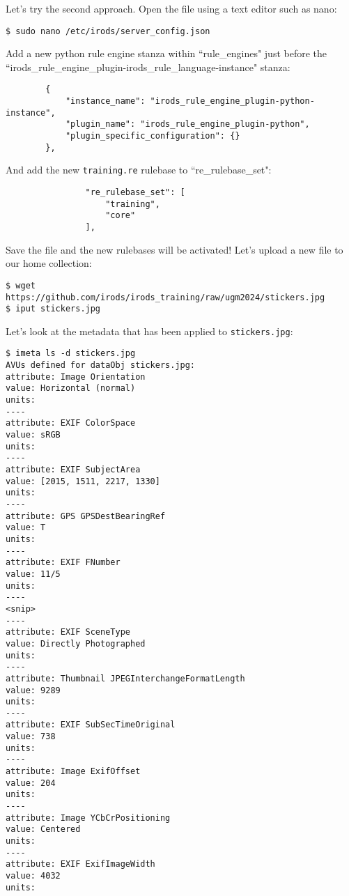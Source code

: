 \documentclass[10pt,oneside]{memoir}
\begin{document}
Let's try the second approach. Open the file using a text editor such as nano:

\begin{lstlisting}
$ sudo nano /etc/irods/server_config.json
\end{lstlisting}

Add a new python rule engine stanza within ``rule\_engines" just before the ``irods\_rule\_engine\_plugin-irods\_rule\_language-instance" stanza:

\begin{lrbox}{\lstServerConfigA}
\begin{lstlisting}
        {
            "instance_name": "irods_rule_engine_plugin-python-instance",
            "plugin_name": "irods_rule_engine_plugin-python",
            "plugin_specific_configuration": {}
        },
\end{lstlisting}
\end{lrbox}
\href{https://github.com/irods/irods_training/blob/ugm2024/beginner/server_config.json#L41-L45}{\usebox{\lstServerConfigA}}

And add the new \texttt{training.re} rulebase to ``re\_rulebase\_set":

\begin{lrbox}{\lstServerConfigB}
\begin{lstlisting}
                "re_rulebase_set": [
                    "training",
                    "core"
                ],
\end{lstlisting}
\end{lrbox}
\href{https://github.com/irods/irods_training/blob/ugm2024/beginner/server_config.json#L56-L59}{\usebox{\lstServerConfigB}}

Save the file and the new rulebases will be activated!  Let's upload a new file to our home collection:

\begin{lstlisting}
$ wget https://github.com/irods/irods_training/raw/ugm2024/stickers.jpg
$ iput stickers.jpg
\end{lstlisting}

\newpage

Let's look at the metadata that has been applied to \texttt{stickers.jpg}:

\begin{lstlisting}
$ imeta ls -d stickers.jpg
AVUs defined for dataObj stickers.jpg:
attribute: Image Orientation
value: Horizontal (normal)
units:
----
attribute: EXIF ColorSpace
value: sRGB
units:
----
attribute: EXIF SubjectArea
value: [2015, 1511, 2217, 1330]
units:
----
attribute: GPS GPSDestBearingRef
value: T
units:
----
attribute: EXIF FNumber
value: 11/5
units:
----
<snip>
----
attribute: EXIF SceneType
value: Directly Photographed
units:
----
attribute: Thumbnail JPEGInterchangeFormatLength
value: 9289
units:
----
attribute: EXIF SubSecTimeOriginal
value: 738
units:
----
attribute: Image ExifOffset
value: 204
units:
----
attribute: Image YCbCrPositioning
value: Centered
units:
----
attribute: EXIF ExifImageWidth
value: 4032
units:
\end{lstlisting}
\end{document}
